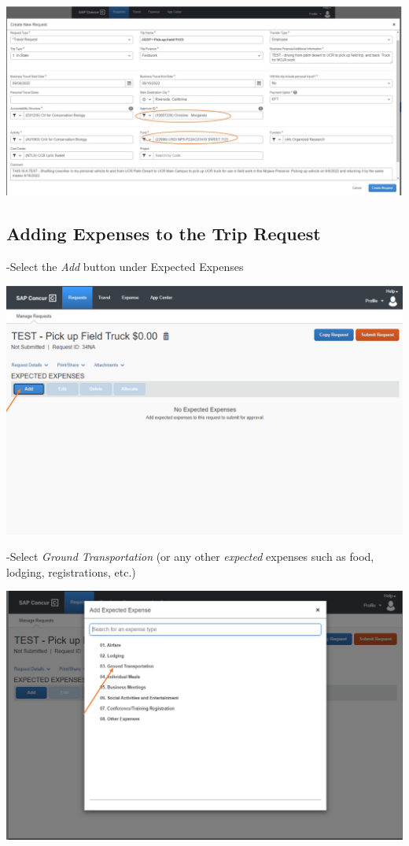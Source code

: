 \documentclass[
]{book}
\begin{document}
\begin{flushleft}\includegraphics[width=0.75\linewidth]{images/concur2a} \end{flushleft}

\hypertarget{adding-expenses-to-the-trip-request}{%
\subsection{Adding Expenses to the Trip Request}\label{adding-expenses-to-the-trip-request}}

-Select the \emph{Add} button under Expected Expenses

\begin{flushleft}\includegraphics[width=0.75\linewidth]{images/concur3} \end{flushleft}

-Select \emph{Ground Transportation} (or any other \emph{expected} expenses such as food, lodging, registrations, etc.)

\begin{flushleft}\includegraphics[width=0.75\linewidth]{images/concur4} \end{flushleft}
\end{document}
